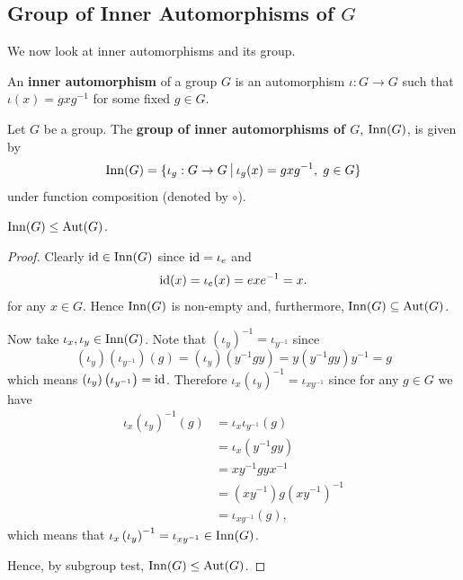 \subsection{Group of Inner Automorphisms of \texorpdfstring{$G$}{G}}
We now look at inner automorphisms and its group.
\begin{definition}
    An \textbf{inner automorphism} of a group $G$ is an automorphism $\iota: G \to G$ such that $\iota(x) = gxg^{-1}$ for some fixed $g \in G$.
\end{definition}
\begin{definition}
    Let $G$ be a group. The \textbf{group of inner automorphisms of $G$}, $\mathrm{Inn}(G)$, is given by
    \[
        \Inn{G} = \{\iota_g: G \to G \vert \iota_g(x) = gxg^{-1},\; g \in G\}
    \]
    under function composition (denoted by $\circ$).
\end{definition}

\begin{proposition}
    $\mathrm{Inn}(G) \leq \mathrm{Aut}(G)$.
\end{proposition}
\begin{proof}
    Clearly $\mathrm{id} \in \mathrm{Inn}(G)$ since $\mathrm{id} = \iota_e$ and 
    \[
        \mathrm{id}(x) = \iota_e(x) = exe^{-1} = x.
    \]
    for any $x \in G$. Hence $\mathrm{Inn}(G)$ is non-empty and, furthermore, $\mathrm{Inn}(G) \subseteq \mathrm{Aut}(G)$.

    Now take $\iota_x, \iota_y \in \mathrm{Inn}(G)$. Note that $\left(\iota_y\right)^{-1} = \iota_{y^{-1}}$ since
    \[
        \left(\iota_y\right)\left(\iota_{y^{-1}}\right)(g) = \left(\iota_y\right)\left(y^{-1}gy\right) = y\left(y^{-1}gy\right)y^{-1} = g
    \]
    which means $\left(\iota_y\right)\left(\iota_{y^{-1}}\right) = \mathrm{id}$. Therefore $\iota_x\left(\iota_y\right)^{-1} = \iota_{xy^{-1}}$ since for any $g \in G$ we have
    \begin{align*}
        \iota_x\left(\iota_y\right)^{-1}(g) &= \iota_x\iota_{y^{-1}}(g)\\
        &= \iota_x\left(y^{-1}gy\right)\\
        &= xy^{-1}gyx^{-1}\\
        &= \left(xy^{-1}\right) g \left(xy^{-1}\right)^{-1}\\
        &= \iota_{xy^{-1}}(g),
    \end{align*}
    which means that $\iota_x\left(\iota_y\right)^{-1} = \iota_{xy^{-1}} \in \mathrm{Inn}(G)$.

    Hence, by subgroup test, $\mathrm{Inn}(G) \leq \mathrm{Aut}(G)$.
\end{proof}

